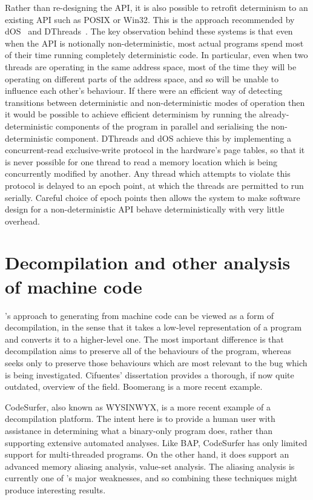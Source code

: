  Rather than re-designing the
API, it is also possible to retrofit determinism to an existing API
such as POSIX or Win32.  This is the approach recommended by
dOS~\cite{Bergan2010} and DThreads~\cite{Liu2011}.  The key
observation behind these systems is that even when the API is
notionally non-deterministic, most actual programs spend most of their
time running completely deterministic code.  In particular, even when
two threads are operating in the same address space, most of the time
they will be operating on different parts of the address space, and so
will be unable to influence each other's behaviour.  If there were an
efficient way of detecting transitions between deterministic and
non-deterministic modes of operation then it would be possible to
achieve efficient determinism by running the already-deterministic
components of the program in parallel and serialising the
non-deterministic component.  DThreads and dOS achieve this by
implementing a concurrent-read exclusive-write protocol in the
hardware's page tables\cite[Chapter 4: Paging]{Intel2009}, so that it
is never possible for one thread to read a memory location which is
being concurrently modified by another.  Any thread which attempts to
violate this protocol is delayed to an epoch point, at which the
threads are permitted to run serially.  Careful choice of epoch points
then allows the system to make software design for a non-deterministic
API behave deterministically with very little overhead.



\section{Decompilation and other analysis of machine code}

{\Technique}'s approach to generating {\StateMachines} from machine
code can be viewed as a form of decompilation, in the sense that it
takes a low-level representation of a program and converts it to a
higher-level one.  The most important difference is that decompilation
aims to preserve all of the behaviours of the program, whereas
{\technique} seeks only to preserve those behaviours which are most
relevant to the bug which is being investigated.  Cifuentes'
dissertation\cite{Cifuentes1994} provides a thorough, if now quite
outdated, overview of the field.  Boomerang\cite{Emmerik2004} is a
more recent example.

CodeSurfer\cite{Balakrishnan2005a,Balakrishnan2008}, also known as
WYSINWYX, is a more recent example of a decompilation platform.  The
intent here is to provide a human user with assistance in determining
what a binary-only program does, rather than supporting extensive
automated analyses.  Like BAP, CodeSurfer has only limited support for
multi-threaded programs.  On the other hand, it does support an
advanced memory aliasing analysis, value-set
analysis\cite{Balakrishnan2004}.  The aliasing analysis is currently
one of {\technique}'s major weaknesses, and so combining these
techniques might produce interesting results.

